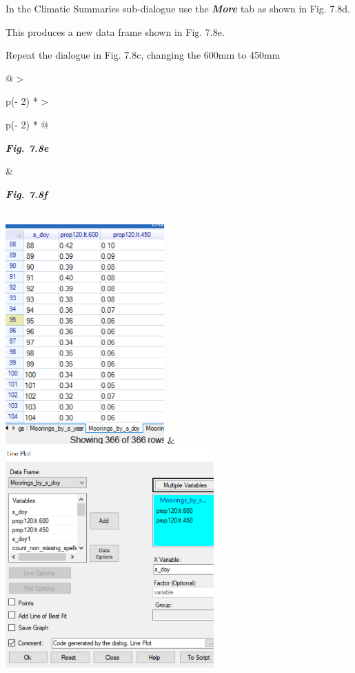 \documentclass[
  letterpaper,
  DIV=11,
  numbers=noendperiod]{scrreprt}
\begin{document}
In the Climatic Summaries sub-dialogue use the \textbf{\emph{More}} tab
as shown in Fig. 7.8d.

This produces a new data frame shown in Fig. 7.8e.

Repeat the dialogue in Fig. 7.8c, changing the 600mm to 450mm

\begin{longtable}[]{@{}
  >{\raggedright\arraybackslash}p{(\columnwidth - 2\tabcolsep) * }
  >{\raggedright\arraybackslash}p{(\columnwidth - 2\tabcolsep) * }@{}}
\toprule\noalign{}
\begin{minipage}[b]{\linewidth}\raggedright
\textbf{\emph{Fig. 7.8e}}
\end{minipage} & \begin{minipage}[b]{\linewidth}\raggedright
\textbf{\emph{Fig. 7.8f}}
\end{minipage} \\
\midrule\noalign{}
\endhead
\bottomrule\noalign{}
\endlastfoot
\includegraphics[width=2.39581in,height=3.30979in]{figures/Fig7.8e.png}
&
\includegraphics[width=3.14726in,height=3.32863in]{figures/Fig7.8f.png} \\
\end{longtable}
\end{document}
